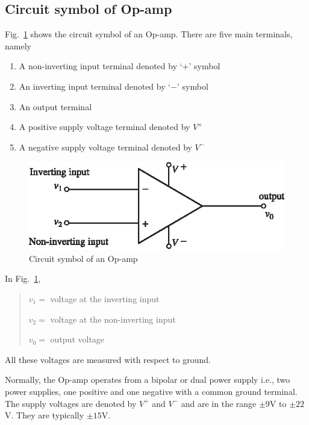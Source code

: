 \subsection{Circuit symbol of Op-amp}\label{sec5.1.1}

Fig.~\ref{fig5.1} shows the circuit symbol of an Op-amp. There are five main terminals, namely
\begin{enumerate}
\itemsep=0pt
\item A non-inverting input terminal denoted by `+' symbol

\item An inverting input terminal denoted by `$-$' symbol

\item An output terminal

\item A positive supply voltage terminal denoted by $V^{+}$

\item A negative supply voltage terminal denoted by $V^{-}$
\end{enumerate}
\begin{figure}[H]
\centering
\includegraphics[scale=1.05]{chap4/S3-EE-06-001.eps}
\caption{Circuit symbol of an Op-amp}\label{fig5.1}
\end{figure}

In Fig.~\ref{fig5.1},
\begin{quote}
$v_{1}=$ voltage at the inverting input

$v_{2}=$ voltage at the non-inverting input

$v_{0}=$ output voltage
\end{quote}
All these voltages are measured with respect to ground.

Normally, the Op-amp operates from a bipolar or dual power supply i.e., two power supplies, one positive and one negative with a common ground terminal. The supply voltages are denoted by $V^{+}$ and $V^{-}$ and are in the range $\pm 9$V to $\pm22$V. They are typically $\pm 15$V.

